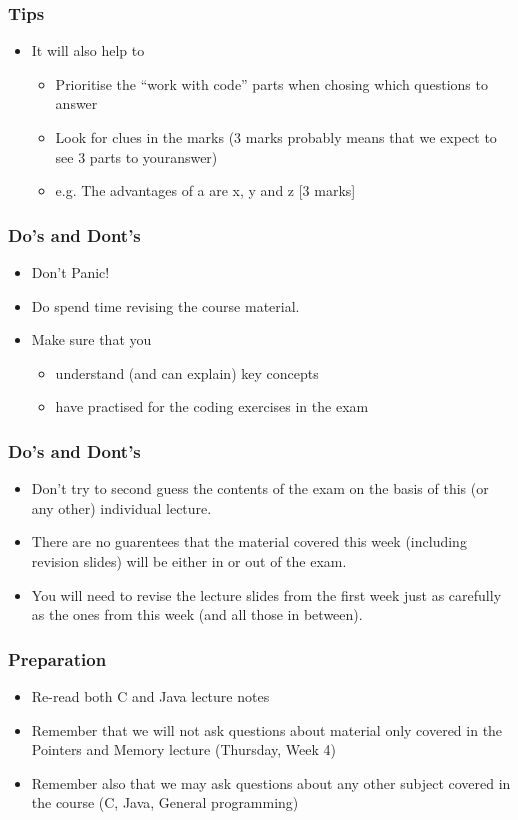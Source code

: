 \documentclass{beamer}
\begin{document}
\begin{frame}
\frametitle{Tips}
\begin{itemize}
\item It will also help to
\begin{itemize}
\item Prioritise the ``work with code'' parts when chosing which questions to answer
\item Look for clues in the marks (3 marks probably means that we expect to see 3 parts to youranswer)
\item e.g. The advantages of a are x, y and z [3 marks]
\end{itemize}
\end{itemize}
\end{frame}

\begin{frame}
\frametitle{Do's and Dont's}
\begin{itemize}
\item Don't Panic!
\item Do spend time revising the course material.
\item Make sure that you
\begin{itemize}
\item understand (and can explain) key concepts
\item have practised for the coding exercises in the exam
\end{itemize}
\end{itemize}
\end{frame}

\begin{frame}
\frametitle{Do's and Dont's}
\begin{itemize}
\item Don't try to second guess the contents of the exam on the basis of this (or any other) individual lecture. 
\item There are no guarentees that the material covered this week (including revision slides) will be either in or out of the exam.
\item You will need to revise the lecture slides from the first week just as carefully as the ones from this week (and all those in between).
\end{itemize}
\end{frame}

\begin{frame}
\frametitle{Preparation}
\begin{itemize}
\item Re-read both C and Java lecture notes 
\item Remember that we will not ask questions about material only covered in the Pointers and Memory lecture (Thursday, Week 4)
\item Remember also that we may ask questions about any other subject covered in the course (C, Java, General programming)
\end{itemize}
\end{frame}
\end{document}
